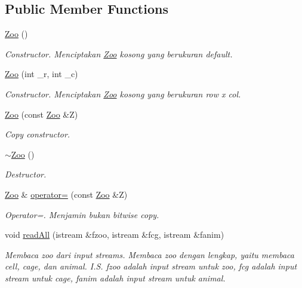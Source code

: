 \subsection*{Public Member Functions}
\begin{DoxyCompactItemize}
\item 
\hyperlink{classZoo_aaa0bf87b544fccd087e471ee0913709c}{Zoo} ()
\begin{DoxyCompactList}\small\item\em Constructor. Menciptakan \hyperlink{classZoo}{Zoo} kosong yang berukuran default. \end{DoxyCompactList}\item 
\hyperlink{classZoo_a559a4e3e19625c596339a31d592088d3}{Zoo} (int \+\_\+r, int \+\_\+c)
\begin{DoxyCompactList}\small\item\em Constructor. Menciptakan \hyperlink{classZoo}{Zoo} kosong yang berukuran row x col. \end{DoxyCompactList}\item 
\hyperlink{classZoo_ac1b6823bf27cb41bfd547ff11c0d7972}{Zoo} (const \hyperlink{classZoo}{Zoo} \&Z)
\begin{DoxyCompactList}\small\item\em Copy constructor. \end{DoxyCompactList}\item 
\hyperlink{classZoo_ab65ebe1fa60f6cf2a7cc55f78ff06ba5}{$\sim$\+Zoo} ()
\begin{DoxyCompactList}\small\item\em Destructor. \end{DoxyCompactList}\item 
\hyperlink{classZoo}{Zoo} \& \hyperlink{classZoo_a21286d1efac894e030422f590f61e029}{operator=} (const \hyperlink{classZoo}{Zoo} \&Z)
\begin{DoxyCompactList}\small\item\em Operator=. Menjamin bukan bitwise copy. \end{DoxyCompactList}\item 
void \hyperlink{classZoo_a8515dac046792e51bc738390607f3dc4}{read\+All} (istream \&fzoo, istream \&fcg, istream \&fanim)
\begin{DoxyCompactList}\small\item\em Membaca zoo dari input streams. Membaca zoo dengan lengkap, yaitu membaca cell, cage, dan animal. I.\+S. fzoo adalah input stream untuk zoo, fcg adalah input stream untuk cage, fanim adalah input stream untuk animal. \end{DoxyCompactList}\item 

\end{DoxyCompactItemize}
